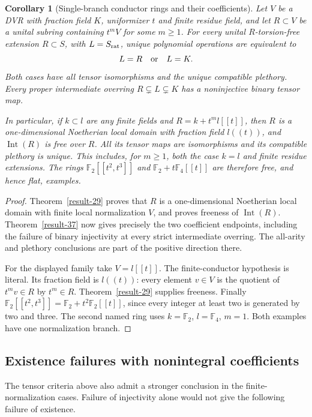 \documentclass[11pt,a4paper]{article}
\newtheorem{corollary}[theorem]{Corollary}
\theoremstyle{definition}
\begin{document}
\begin{corollary}[Single-branch conductor rings and their coefficients]\label{result-51}
Let $V$ be a DVR with fraction field $K$, uniformizer $t$ and finite
residue field, and let $R\subset V$ be a unital subring containing
$t^mV$ for some $m\ge1$. For every unital $R$-torsion-free extension
$R\subset S$, with $L=S_{\rm rat}$, unique polynomial operations are
equivalent to
\[
                         L=R\quad\hbox{or}\quad L=K.
\]
Both cases have all tensor isomorphisms and the unique compatible
plethory. Every proper intermediate overring $R\subsetneq L\subsetneq K$
has a noninjective binary tensor map.

In particular, if $k\subset l$ are any finite fields and
$R=k+t^m l[[t]]$, then $R$ is a one-dimensional Noetherian local domain
with fraction field $l((t))$, and $\operatorname{Int}(R)$ is free
over $R$. All its tensor maps are isomorphisms and its compatible
plethory is unique. This includes, for $m\ge1$, both the case $k=l$
and finite residue extensions. The rings
$\mathbb F_2[[t^2,t^3]]$ and $\mathbb F_2+t\mathbb F_4[[t]]$
are therefore free, and hence flat, examples.
\end{corollary}
\begin{proof}
Theorem~\ref{result-29} proves that $R$ is a one-dimensional Noetherian
local domain with finite local normalization $V$, and proves freeness
of $\operatorname{Int}(R)$. Theorem~\ref{result-37} now gives precisely
the two coefficient endpoints, including the failure of binary
injectivity at every strict intermediate overring. The all-arity and
plethory conclusions are part of the positive direction there.

For the displayed family take $V=l[[t]]$. The finite-conductor
hypothesis is literal. Its fraction field is $l((t))$: every element
$v\in V$ is the quotient of $t^m v\in R$ by $t^m\in R$.
Theorem~\ref{result-29} supplies freeness. Finally
$\mathbb F_2[[t^2,t^3]]=\mathbb F_2+t^2\mathbb F_2[[t]]$,
since every integer at least two is generated by two and three.
The second named ring uses $k=\mathbb F_2$, $l=\mathbb F_4$, $m=1$.
Both examples have one normalization branch.
\end{proof}

\subsection{Existence failures with nonintegral coefficients}
The tensor criteria above also admit a stronger conclusion in the
finite-normalization cases. Failure of injectivity alone would not
give the following failure of existence.
\end{document}
